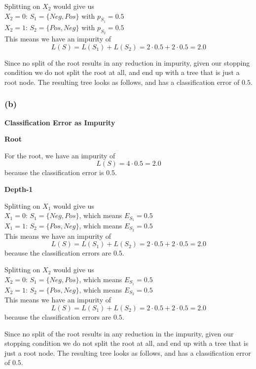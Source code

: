 \documentclass{article}
\begin{document}
Splitting on $X_2$ would give us \\
$X_2 = 0$: $S_1 = \{ Neg, Pos \}$ with $p_{S_1} = 0.5$ \\
$X_2 = 1$: $S_2 = \{ Pos, Neg \}$ with $p_{S_2} = 0.5$ \\
This means we have an impurity of
\[ L(S) = L(S_1) + L(S_2) = 2 \cdot 0.5 + 2 \cdot 0.5 = 2.0 \]

Since no split of the root results in any reduction in impurity, given our stopping
condition we do not split the root at all, and end up with a tree that is just a root node.
The resulting tree looks as follows, and has a classification error of $0.5$.

\vspace{5mm}

\subsubsection*{(b)}
\textbf{Classification Error as Impurity}

\noindent \textbf{Root}

For the root, we have an impurity of
\[ L(S) = 4 \cdot 0.5 = 2.0 \]
because the classification error is $0.5$.

\noindent \textbf{Depth-1}

Splitting on $X_1$ would give us \\
$X_1 = 0$: $S_1 = \{ Neg, Pos \}$, which means $E_{S_1} = 0.5$ \\
$X_1 = 1$: $S_2 = \{ Pos, Neg \}$, which means $E_{S_2} = 0.5$ \\
This means we have an impurity of
\[ L(S) = L(S_1) + L(S_2) = 2 \cdot 0.5 + 2 \cdot 0.5 = 2.0 \]
because the classification errors are $0.5$.

Splitting on $X_2$ would give us \\
$X_2 = 0$: $S_1 = \{ Neg, Pos \}$, which means $E_{S_1} = 0.5$ \\
$X_2 = 1$: $S_2 = \{ Pos, Neg \}$, which means $E_{S_2} = 0.5$ \\
This means we have an impurity of
\[ L(S) = L(S_1) + L(S_2) = 2 \cdot 0.5 + 2 \cdot 0.5 = 2.0 \]
because the classification errors are $0.5$.

Since no split of the root results in any reduction in the impurity, given our stopping
condition we do not split the root at all, and end up with a tree that is just a root node.
The resulting tree looks as follows, and has a classification error of $0.5$.
\end{document}
